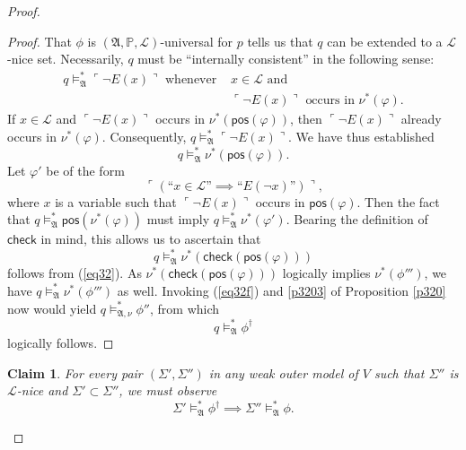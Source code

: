\documentclass[12pt, twoside]{memoir}
\numberwithin{equation}{section}
\newtheorem{claim2}[thm]{Claim}
\theoremstyle{definition}
\theoremstyle{remark}
\theoremstyle{definition}
\theoremstyle{definition}
\theoremstyle{definition}
\theoremstyle{remark}
\begin{document}
\begin{proof}
\begin{enumerate}[label=Case \arabic*:, leftmargin=50pt]
\begin{proof}
    That $\phi$ is $(\mathfrak{A}, \mathbb{P}, \mathcal{L})$-universal for $p$ tells us that $q$ can be extended to a $\mathcal{L}$-nice set. Necessarily, $q$ must be ``internally consistent'' in the following sense:
    \begin{align*}
        q \models^{*}_{\mathfrak{A}} \ulcorner \neg E(x) \urcorner \text{ whenever } & x \in \mathcal{L} \text{ and } \\
        & \ulcorner \neg E(x) \urcorner \text{ occurs in } \nu^*(\varphi).
    \end{align*} 
    If $x \in \mathcal{L}$ and $\ulcorner \neg E(x) \urcorner$ occurs in $\nu^*(\mathsf{pos}(\varphi))$, then $\ulcorner \neg E(x) \urcorner$ already occurs in $\nu^*(\varphi)$. Consequently, $q \models^{*}_{\mathfrak{A}} \ulcorner \neg E(x) \urcorner$. We have thus established 
    \begin{equation}\label{eq32}
        q \models^{*}_{\mathfrak{A}} \nu^*(\mathsf{pos}(\varphi)).
    \end{equation} 
    Let $\varphi'$ be of the form $$\ulcorner (\text{``}x \in \mathcal{L} \text{''} \implies \text{``} E(\neg x) \text{''}) \urcorner \text{,}$$ where $x$ is a variable such that $\ulcorner \neg E(x) \urcorner$ occurs in $\mathsf{pos}(\varphi)$. Then the fact that $q \models^{*}_{\mathfrak{A}} \mathsf{pos}(\nu^*(\varphi))$ must imply $q \models^{*}_{\mathfrak{A}} \nu^*(\varphi')$. Bearing the definition of $\mathsf{check}$ in mind, this allows us to ascertain that $$q \models^{*}_{\mathfrak{A}} \nu^*(\mathsf{check}(\mathsf{pos}(\varphi)))$$ follows from (\ref{eq32}). As $\nu^*(\mathsf{check}(\mathsf{pos}(\varphi)))$ logically implies $\nu^*(\phi''')$, we have $q \models^{*}_{\mathfrak{A}} \nu^*(\phi''')$ as well. Invoking (\ref{eq32f}) and \ref{p3203} of Proposition \ref{p320} now would yield $q \models^{*}_{\mathfrak{A}, \nu} \phi''$, from which
    \begin{equation*}
        q \models^{*}_{\mathfrak{A}} \phi^{\dagger}
    \end{equation*}
    logically follows.
    \end{proof}

    \begin{claim2}\label{claim341}
    For every pair $(\Sigma', \Sigma'')$ in any weak outer model of $V$ such that $\Sigma''$ is $\mathcal{L}$-nice and $\Sigma' \subset \Sigma''$, we must observe
    \begin{equation*}
        \Sigma' \models^{*}_{\mathfrak{A}} \phi^{\dagger} \implies \Sigma'' \models^{*}_{\mathfrak{A}} \phi \text{.}
    \end{equation*}
    \end{claim2}


\end{enumerate}
\end{proof}
\end{document}

